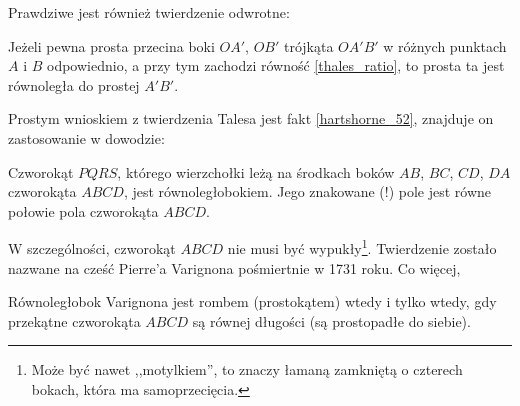 Prawdziwe jest również twierdzenie odwrotne:

\begin{proposition}
    Jeżeli pewna prosta przecina boki $OA'$, $OB'$ trójkąta $OA'B'$ w różnych punktach $A$ i $B$ odpowiednio, a przy tym zachodzi równość \ref{thales_ratio}, to prosta ta jest równoległa do prostej $A'B'$.
\end{proposition}

Prostym wnioskiem z twierdzenia Talesa jest fakt \ref{hartshorne_52}, znajduje on zastosowanie w dowodzie:

\begin{theorem}[Varignona]
    Czworokąt $PQRS$, którego wierzchołki leżą na środkach boków $AB$, $BC$, $CD$, $DA$ czworokąta $ABCD$, jest równoległobokiem.
    Jego znakowane  (!) pole jest równe połowie pola czworokąta $ABCD$. %
\end{theorem}



W szczególności, czworokąt $ABCD$ nie musi być wypukły\footnote{Może być nawet ,,motylkiem'', to znaczy łamaną zamkniętą o czterech bokach, która ma samoprzecięcia.}.
Twierdzenie zostało nazwane na cześć Pierre'a Varignona pośmiertnie w 1731 roku.
%
Co więcej,

\begin{proposition}
    Równoległobok Varignona jest rombem (prostokątem) wtedy i tylko wtedy, gdy przekątne czworokąta $ABCD$ są równej długości (są prostopadłe do siebie).
%
%
%
\end{proposition}

%